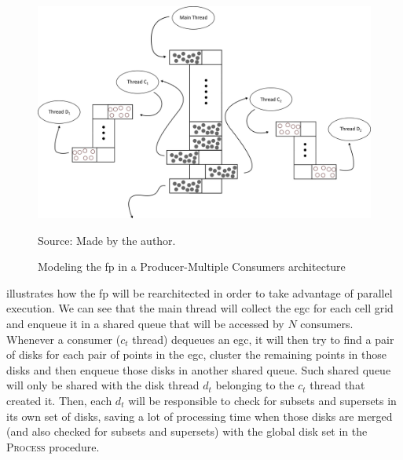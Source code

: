 \begin{figure}[h!]
    \centering
    \caption{Modeling the \ac{fp} in a Producer-Multiple Consumers architecture}
    \centerline{\includegraphics[width=\linewidth]{images/multithread.eps}}
    \footnotesize{Source: Made by the author.}
    \label{fig:multithread}
\end{figure}

 illustrates how the \ac{fp} will be rearchitected in order to take advantage of parallel
execution.  We can see that the main thread will collect the \ac{egc} for each cell grid and enqueue it in a shared
queue that will be accessed by $N$ consumers. Whenever a consumer ($c_t$ thread) dequeues an \ac{egc}, it will then try
to find a pair of disks for each pair of points in the \ac{egc}, cluster the remaining points in those disks and then
enqueue those disks in another shared queue. Such shared queue will only be shared with the disk thread $d_t$ belonging
to the $c_t$ thread that created it. Then, each $d_t$ will be responsible to check for subsets and supersets in its own
set of disks, saving a lot of processing time when those disks are merged (and also checked for subsets and supersets)
with the global disk set in the \textsc{Process} procedure.
